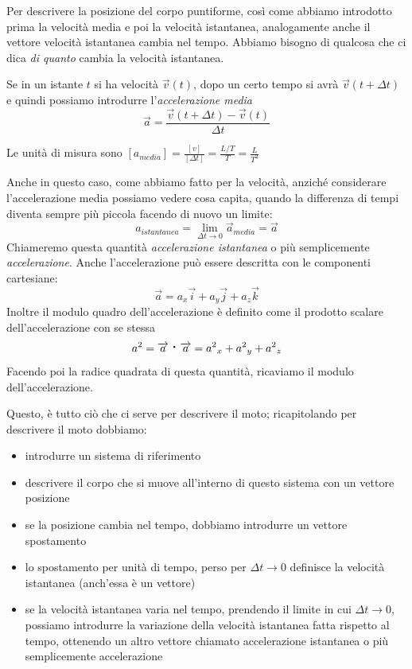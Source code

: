 Per descrivere la posizione del corpo puntiforme, così come abbiamo introdotto prima la velocità media e poi la velocità istantanea, analogamente anche il vettore velocità istantanea cambia nel tempo. Abbiamo bisogno di qualcosa che ci dica \textit{di quanto}
cambia la velocità istantanea. 


Se in un istante $t$ si ha velocità $\overrightarrow{v}(t)$, 
dopo un certo tempo si avrà  $\overrightarrow{v}(t +\Delta t)$ e quindi 
possiamo introdurre l'\textit{accelerazione media}
\begin{equation}
    \overrightarrow{a}=
    \frac{\overrightarrow{v}(t +\Delta t) - \overrightarrow{v}(t)}{\Delta t} 
\end{equation}

Le unità di misura sono
 $[a_{media}]=\frac{[v]}{[\Delta t]}= \frac{L/T}{T}=\frac{L}{T^2}$

Anche in questo caso, come abbiamo fatto per la velocità,  anziché considerare l'accelerazione media possiamo vedere cosa capita, quando la differenza di tempi diventa sempre più piccola facendo di nuovo un limite:
$$ a_{istantanea} = \lim_{ \Delta t \to 0} {\overrightarrow{a}_{media} } = \overrightarrow{a}  $$
Chiameremo questa quantità \textit{accelerazione istantanea} o più semplicemente \textit{accelerazione}.
Anche l'accelerazione può essere descritta con le componenti cartesiane:
$$ \overrightarrow{a} = a_{x} \overrightarrow{i} + a_{y} \overrightarrow{j} + a_{z} \overrightarrow{k} $$
Inoltre il modulo quadro dell'accelerazione è definito come il prodotto scalare dell'accelerazione con se stessa
$$ a^{2} = \overrightarrow{a} \prodscal \overrightarrow{a} = {a^{2}}_{x} + {a^{2}}_{y} + {a^{2}}_{z} $$
Facendo poi la radice quadrata di questa quantità, ricaviamo il modulo dell'accelerazione.

Questo, è tutto ciò che ci serve per descrivere il moto; ricapitolando per descrivere il moto dobbiamo:
\begin{itemize}
	\item introdurre un sistema di riferimento
	\item descrivere il corpo che si muove all'interno di questo sistema con un vettore posizione
	\item se la posizione cambia nel tempo, dobbiamo introdurre un vettore spostamento
	\item lo spostamento per unità di tempo, perso per $\Delta t \to 0$ definisce la velocità istantanea (anch'essa è un vettore)
	\item se la velocità istantanea varia nel tempo,  prendendo il limite in cui $\Delta t \to 0$,  possiamo introdurre la variazione della velocità istantanea fatta rispetto al tempo, ottenendo un altro vettore chiamato accelerazione istantanea o più semplicemente accelerazione
\end{itemize}

